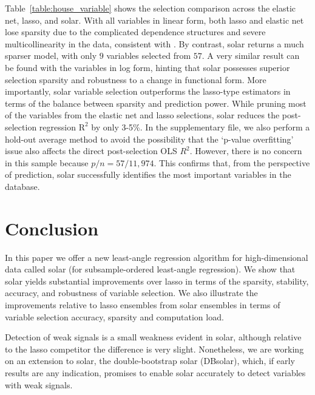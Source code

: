 \documentclass[11pt,authoryear]{elsarticle}
\begin{document}
Table~\ref{table:house_variable} shows the selection comparison across the elastic net, lasso, and solar. With all variables in linear form, both lasso and elastic net lose sparsity due to the complicated dependence structures and severe multicollinearity in the data, consistent with \citet{jia2010model}. By contrast, solar returns a much sparser model, with only $9$ variables selected from $57$. A very similar result can be found with the variables in log form, hinting that solar possesses superior selection sparsity and robustness to a change in functional form. More importantly, solar variable selection outperforms the lasso-type estimators in terms of the balance between sparsity and prediction power. While pruning most of the variables from the elastic net and lasso selections, solar reduces the post-selection regression $\mathrm{R}^2$ by only 3-5\%. In the supplementary file, we also perform a hold-out average method to avoid the possibility that the `p-value overfitting' issue also affects the direct post-selection OLS $R^2$. However, there is no concern in this sample because $p/n=57/11,974$. This confirms that, from the perspective of prediction, solar successfully identifies the most important variables in the database.


\section{Conclusion}

In this paper we offer a new least-angle regression algorithm for high-dimensional data called solar (for subsample-ordered least-angle regression). We show that solar yields substantial improvements over lasso in terms of the sparsity, stability, accuracy, and robustness of variable selection. We also illustrate the improvements relative to lasso ensembles from solar ensembles in terms of variable selection accuracy, sparsity and computation load.

Detection of weak signals is a small weakness evident in solar, although relative to the lasso competitor the difference is very slight. Nonetheless, we are working on an extension to solar, the double-bootstrap solar (DBsolar), which, if early results are any indication, promises to enable solar accurately to detect variables with weak signals.

\end{document}
